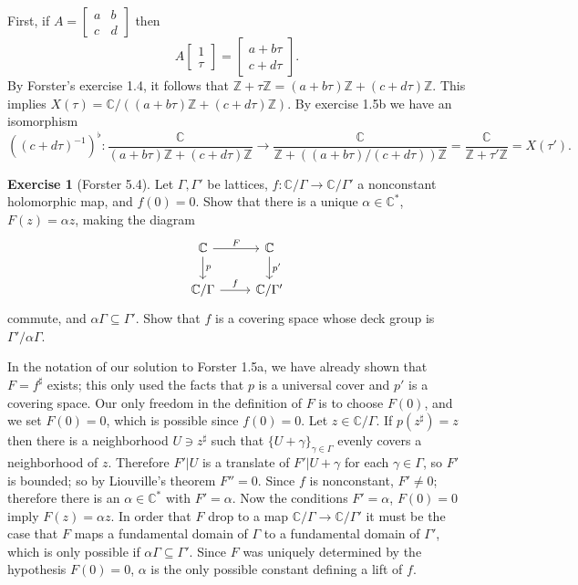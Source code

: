 \documentclass[10pt]{article}
\newcommand{\ZZ}{\mathbb{Z}}
\newcommand{\CC}{\mathbb{C}}
\theoremstyle{definition}
\newtheorem{exer}{Exercise}
\begin{document}
First, if $A = \begin{bmatrix}a&b\\c&d\end{bmatrix}$ then
$$A\begin{bmatrix}1\\\tau\end{bmatrix} = \begin{bmatrix}a + b\tau\\c+d\tau\end{bmatrix}.$$
By Forster's exercise 1.4, it follows that $\ZZ + \tau\ZZ = (a+b\tau)\ZZ + (c+d\tau)\ZZ$.
This implies $X(\tau) = \CC/((a+b\tau)\ZZ + (c+d\tau)\ZZ)$.
By exercise 1.5b we have an isomorphism
$$((c+d\tau)^{-1})^\flat: \frac{\CC}{(a+b\tau)\ZZ + (c+d\tau)\ZZ} \to \frac{\CC}{\ZZ + ((a+b\tau)/(c+d\tau))\ZZ} = \frac{\CC}{\ZZ + \tau'\ZZ} = X(\tau').$$

\begin{exer}[Forster 5.4]
Let $\Gamma,\Gamma'$ be lattices, $f: \CC/\Gamma \to \CC/\Gamma'$ a nonconstant holomorphic map, and $f(0) = 0$.
Show that there is a unique $\alpha \in \CC^*$, $F(z) = \alpha z$, making the diagram
$$\begin{tikzcd}
\CC \arrow[r,"F"] \arrow[d,"p"] & \CC \arrow[d,"p'"]\\
\CC/\Gamma \arrow[r,"f"] & \CC/\Gamma'\end{tikzcd}$$
commute, and $\alpha \Gamma \subseteq \Gamma'$. Show that $f$ is a covering space whose deck group is $\Gamma'/\alpha \Gamma$.
\end{exer}

In the notation of our solution to Forster 1.5a, we have already shown that $F = f^\sharp$ exists; this only used the facts that $p$ is a universal cover and $p'$ is a covering space.
Our only freedom in the definition of $F$ is to choose $F(0)$, and we set $F(0) = 0$, which is possible since $f(0) = 0$.
Let $z \in \CC/\Gamma$. If $p(z^\sharp) = z$ then there is a neighborhood $U \ni z^\sharp$ such that $\{U + \gamma\}_{\gamma \in \Gamma}$ evenly covers a neighborhood of $z$.
Therefore $F'|U$ is a translate of $F'|U + \gamma$ for each $\gamma \in \Gamma$, so $F'$ is bounded; so by Liouville's theorem $F'' = 0$.
Since $f$ is nonconstant, $F' \neq 0$; therefore there is an $\alpha \in \CC^*$ with $F' = \alpha$.
Now the conditions $F' = \alpha$, $F(0) = 0$ imply $F(z) = \alpha z$.
In order that $F$ drop to a map $\CC/\Gamma \to \CC/\Gamma'$ it must be the case that $F$ maps a fundamental domain of $\Gamma$ to a fundamental domain of $\Gamma'$, which is only possible if $\alpha \Gamma \subseteq \Gamma'$.
Since $F$ was uniquely determined by the hypothesis $F(0) = 0$, $\alpha$ is the only possible constant defining a lift of $f$.
\end{document}
